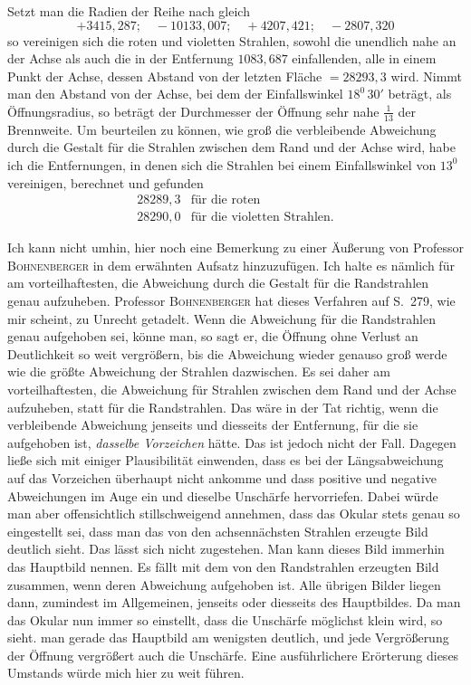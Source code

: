 Setzt man die Radien der Reihe nach gleich
\[
+3415{,}287;\quad -10133{,}007;\quad +4207{,}421;\quad -2807{,}320
\]
so vereinigen sich die roten und violetten Strahlen, sowohl die unendlich nahe an der Achse als auch die in der Entfernung $1083{,}687$ einfallenden, alle in einem Punkt der Achse, dessen Abstand von der letzten Fläche $=28293{,}3$ wird. Nimmt man den Abstand von der Achse, bei dem der Einfallswinkel $18^0\,30'$ beträgt, als Öffnungsradius, so beträgt der Durchmesser der Öffnung sehr nahe $\tfrac{1}{13}$ der Brennweite. Um beurteilen zu können, wie groß die verbleibende Abweichung durch die Gestalt für die Strahlen zwischen dem Rand und der Achse wird, habe ich die Entfernungen, in denen sich die Strahlen bei einem Einfallswinkel von $13^0$ vereinigen, berechnet und gefunden
\[
\begin{array}{ll}
28289{,}3&\text{für die roten}\\
28290{,}0&\text{für die violetten Strahlen.}
\end{array}
\]

Ich kann nicht umhin, hier noch eine Bemerkung zu einer Äußerung von Professor \textsc{Bohnenberger} in dem erwähnten Aufsatz hinzuzufügen. Ich halte es nämlich für am vorteilhaftesten, die Abweichung durch die Gestalt für die Randstrahlen genau aufzuheben. Professor \textsc{Bohnenberger} hat dieses Verfahren auf S.\ 279, wie mir scheint, zu Unrecht getadelt. Wenn die Abweichung für die Randstrahlen genau aufgehoben sei, könne man, so sagt er, die Öffnung ohne Verlust an Deutlichkeit so weit vergrößern, bis die Abweichung wieder genauso groß werde wie die größte Abweichung der Strahlen dazwischen. Es sei daher am vorteilhaftesten, die Abweichung für Strahlen zwischen dem Rand und der Achse aufzuheben, statt für die Randstrahlen. Das wäre in der Tat richtig, wenn die verbleibende Abweichung jenseits und diesseits der Entfernung, für die sie aufgehoben ist, \textit{dasselbe Vorzeichen} hätte. Das ist jedoch nicht der Fall. Dagegen ließe sich mit einiger Plausibilität einwenden, dass es bei der Längsabweichung auf das Vorzeichen überhaupt nicht ankomme und dass positive und negative Abweichungen im Auge ein und dieselbe Unschärfe hervorriefen. Dabei würde man aber offensichtlich stillschweigend annehmen, dass das Okular stets genau so eingestellt sei, dass man das von den achsennächsten Strahlen erzeugte Bild deutlich sieht. Das lässt sich nicht zugestehen. Man kann dieses Bild immerhin das Hauptbild nennen. Es fällt mit dem von den Randstrahlen erzeugten Bild zusammen, wenn deren Abweichung aufgehoben ist. Alle übrigen Bilder liegen dann, zumindest im Allgemeinen, jenseits oder diesseits des Hauptbildes. Da man das Okular nun immer so einstellt, dass die Unschärfe möglichst klein wird, so sieht. man gerade das Hauptbild am wenigsten deutlich, und jede Vergrößerung der Öffnung vergrößert auch die Unschärfe. Eine ausführlichere Erörterung dieses Umstands würde mich hier zu weit führen.
